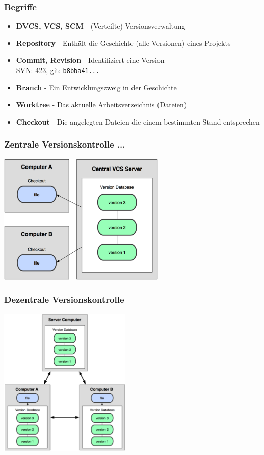 \begin{frame}
  \frametitle{Begriffe}
  \begin{itemize}
    \item {\bf DVCS, VCS, SCM} - (Verteilte) Versionsverwaltung
    \item {\bf Repository} - Enthält die Geschichte (alle Versionen) eines Projekts
    \item {\bf Commit, Revision} - Identifiziert eine Version \\ SVN: 423, git: {\tt b8bba41...}
    \item {\bf Branch} - Ein Entwicklungszweig in der Geschichte
    \item {\bf Worktree} - Das aktuelle Arbeitsverzeichnis (Dateien)
    \item {\bf Checkout} - Die angelegten Dateien die einem bestimmten Stand entsprechen
  \end{itemize}
\end{frame}

\begin{frame}
  \frametitle{Zentrale Versionskontrolle ...}
  \begin{center}
    \includegraphics[width=8cm]{img/central_vcs.png}
  \end{center}
\end{frame}

\begin{frame}
  \frametitle{Dezentrale Versionskontrolle}
  \begin{center}
    \includegraphics[width=6.3cm]{img/distributed_vcs.png}
  \end{center}
\end{frame}

